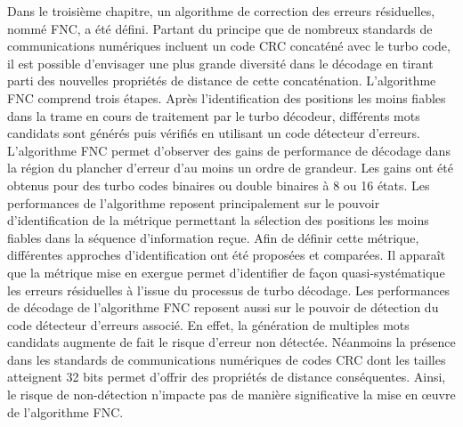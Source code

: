 Dans le troisième chapitre, un algorithme de correction des erreurs résiduelles, nommé FNC, a été défini. 
Partant du principe que de nombreux standards de communications numériques incluent un code CRC concaténé avec le turbo 
code, il est possible d'envisager une plus grande diversité dans le décodage en tirant parti des nouvelles propriétés de 
distance de cette concaténation.
L'algorithme FNC comprend trois étapes. Après l'identification des positions les moins fiables dans la trame en cours de traitement par le turbo décodeur,
différents mots candidats sont générés puis vérifiés en utilisant un code détecteur d'erreurs. L'algorithme FNC permet 
d'observer des gains de performance de décodage dans la région du plancher d'erreur d'au moins un ordre de 
grandeur. Les gains ont été obtenus pour des turbo codes binaires ou double binaires à 8 ou 16 états. Les
performances de l'algorithme reposent principalement sur le pouvoir d'identification de la métrique permettant la sélection des positions
les moins fiables dans la séquence d'information reçue. Afin de définir cette métrique, différentes approches
d'identification ont été proposées et comparées. Il apparaît que la métrique mise en exergue permet d'identifier de 
façon quasi-systématique les erreurs résiduelles à l'issue du processus de turbo décodage. Les performances de décodage de
l'algorithme FNC reposent aussi sur le pouvoir de détection du code détecteur d'erreurs associé. En effet, la génération
de multiples mots candidats augmente de fait le risque d'erreur non détectée. Néanmoins la présence
dans les standards de communications numériques de codes CRC dont les tailles atteignent 32 bits permet d'offrir des propriétés 
de distance conséquentes. Ainsi, le risque de non-détection n'impacte pas de manière significative la mise en œuvre de l'algorithme FNC. 

